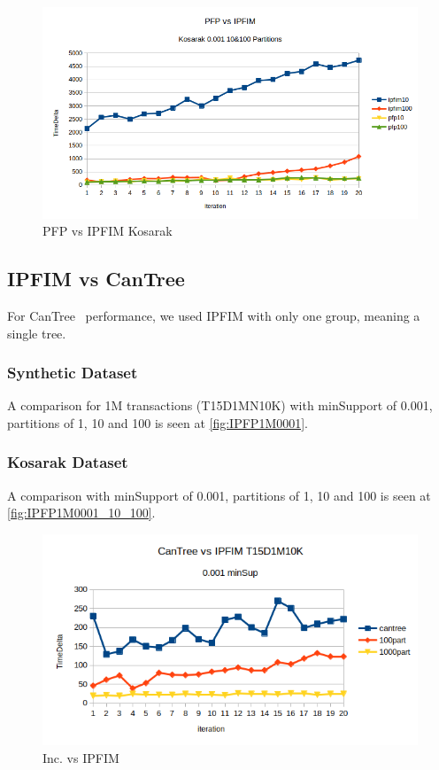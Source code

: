 \begin{figure}
  \centering
  \includegraphics[width=\linewidth]{figures/PFPvsIPFIM0_001_Kosarak}
  \caption{PFP vs IPFIM Kosarak}
  \label{fig:PFPvsIPFPKos}
\end{figure}


\subsection{IPFIM vs CanTree}
For CanTree~\cite{leung2005cantree} performance, we used IPFIM with only one group, meaning a single tree.

\subsubsection{Synthetic Dataset}
A comparison for 1M transactions (T15D1MN10K) with minSupport of 0.001, partitions of 1, 10 and 100 is seen at \autoref{fig:IPFP1M0001}.

\subsubsection{Kosarak Dataset}
A comparison with minSupport of 0.001, partitions of 1, 10 and 100 is seen at \autoref{fig:IPFP1M0001_10_100}.


\begin{figure}
  \centering
  \includegraphics[width=\linewidth]{figures/IPFP1M0001}
  \caption{Inc. vs IPFIM}
  \label{fig:IPFP1M0001}
\end{figure}

